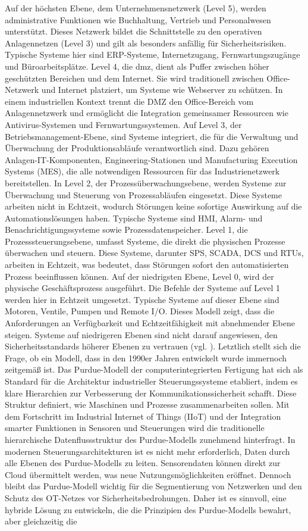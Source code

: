 \noindent Auf der höchsten Ebene, dem Unternehmensnetzwerk (Level 5), werden administrative Funktionen wie Buchhaltung, Vertrieb und Personalwesen unterstützt. Dieses Netzwerk bildet die Schnittstelle zu den operativen Anlagennetzen (Level 3) und gilt als besonders anfällig für Sicherheitsrisiken. Typische Systeme hier sind ERP-Systeme, Internetzugang, Fernwartungszugänge und Büroarbeitsplätze. Level 4, die \ac{dmz}, dient als Puffer zwischen höher geschützten Bereichen und dem Internet. Sie wird traditionell zwischen Office-Netzwerk und Internet platziert, um Systeme wie Webserver zu schützen. In einem industriellen Kontext trennt die DMZ den Office-Bereich vom Anlagennetzwerk und ermöglicht die Integration gemeinsamer Ressourcen wie Antivirus-Systemen und Fernwartungssystemen. Auf Level 3, der Betriebsmanagement-Ebene, sind Systeme integriert, die für die Verwaltung und Überwachung der Produktionsabläufe verantwortlich sind. Dazu gehören Anlagen-IT-Komponenten, Engineering-Stationen und Manufacturing Execution Systems (MES), die alle notwendigen Ressourcen für das Industrienetzwerk bereitstellen. In Level 2, der Prozessüberwachungsebene, werden Systeme zur Überwachung und Steuerung von Prozessabläufen eingesetzt. Diese Systeme arbeiten nicht in Echtzeit, wodurch Störungen keine sofortige Auswirkung auf die Automationslösungen haben. Typische Systeme sind HMI, Alarm- und Benachrichtigungssysteme sowie Prozessdatenspeicher. Level 1, die Prozesssteuerungsebene, umfasst Systeme, die direkt die physischen Prozesse überwachen und steuern. Diese Systeme, darunter SPS, SCADA, DCS und RTUs, arbeiten in Echtzeit, was bedeutet, dass Störungen sofort den automatisierten Prozess beeinflussen können. Auf der niedrigsten Ebene, Level 0, wird der physische Geschäftsprozess ausgeführt. Die Befehle der Systeme auf Level 1 werden hier in Echtzeit umgesetzt. Typische Systeme auf dieser Ebene sind Motoren, Ventile, Pumpen und Remote I/O. Dieses Modell zeigt, dass die Anforderungen an Verfügbarkeit und Echtzeitfähigkeit mit abnehmender Ebene steigen. Systeme auf niedrigeren Ebenen sind nicht darauf angewiesen, den Sicherheitsstandards höherer Ebenen zu vertrauen (vgl. \cite{sichereIndustrie2}). Letztlich stellt sich die Frage, ob ein Modell, dass in den 1990er Jahren entwickelt wurde immernoch zeitgemäß ist. Das Purdue-Modell der computerintegrierten Fertigung hat sich als Standard für die Architektur industrieller Steuerungssysteme etabliert, indem es klare Hierarchien zur Verbesserung der Kommunikationssicherheit schafft. Diese Struktur definiert, wie Maschinen und Prozesse zusammenarbeiten sollen. Mit dem Fortschritt im Industrial Internet of Things (IIoT) und der Integration smarter Funktionen in Sensoren und Steuerungen wird die traditionelle hierarchische Datenflussstruktur des Purdue-Modells zunehmend hinterfragt. In modernen Steuerungsarchitekturen ist es nicht mehr erforderlich, Daten durch alle Ebenen des Purdue-Modells zu leiten. Sensorendaten können direkt zur Cloud übermittelt werden, was neue Nutzungsmöglichkeiten eröffnet. Dennoch bleibt das Purdue-Modell wichtig für die Segmentierung von Netzwerken und den Schutz des OT-Netzes vor Sicherheitsbedrohungen. Daher ist es sinnvoll, eine hybride Lösung zu entwickeln, die die Prinzipien des Purdue-Modells bewahrt, aber gleichzeitig die 